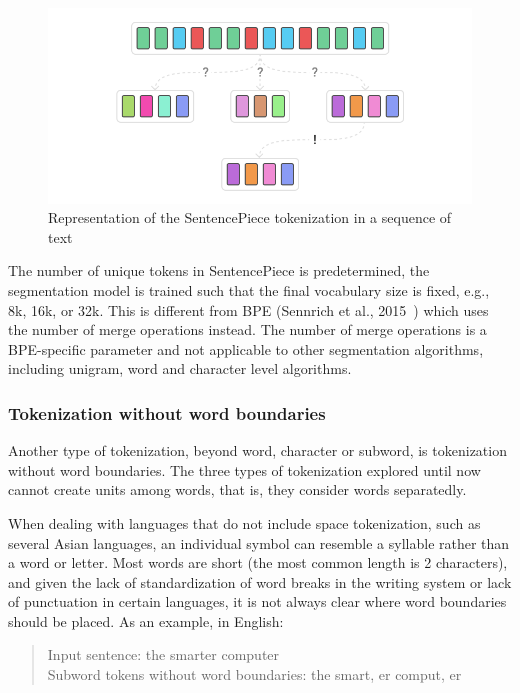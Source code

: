 \begin{figure}[!ht]
    \centering
    \includegraphics[width=14cm]{figures/sentencepiece.png}
    \caption{Representation of the SentencePiece tokenization in a sequence of text}
\end{figure}

The number of unique tokens in SentencePiece is predetermined, the segmentation model is trained such that the final vocabulary size is fixed, e.g., 8k, 16k, or 32k. This is different from BPE (Sennrich et al., 2015~\cite{sennrich2015neural}) which uses the number of merge operations instead. The number of merge operations is a BPE-specific parameter and not applicable to other segmentation algorithms, including unigram, word and character level algorithms.

\subsubsection{Tokenization without word boundaries}\label{subsec:wordtokwowb}

Another type of tokenization, beyond word, character or subword, is tokenization without word boundaries. The three types of tokenization explored until now cannot create units among words, that is, they consider words separatedly.

When dealing with languages that do not include space tokenization, such as several Asian languages, an individual symbol can resemble a syllable rather than a word or letter. Most words are short (the most common length is 2 characters), and given the lack of standardization of word breaks in the writing system or lack of punctuation in certain languages, it is not always clear where word boundaries should be placed. As an example, in English:

\begin{quote}
    Input sentence: the smarter computer\\
    Subword tokens without word boundaries: the smart, er comput, er
\end{quote}

